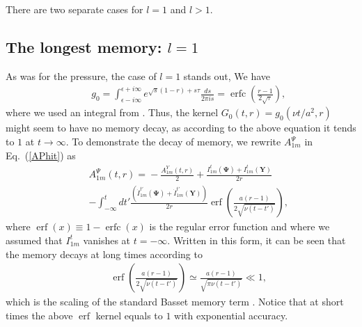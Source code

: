 \documentclass[aps,prx,twocolumn,amsmath,amssymb,amsfonts]{revtex4-2}
\DeclareMathOperator\erfc{erfc}
\DeclareMathOperator\erf{erf}
\begin{document}
There are two separate cases for $l=1$ and $l>1$.

\subsection{The longest memory: $l=1$}

As was for the pressure, the case of $l=1$ stands out,  We have
\begin{eqnarray}&&\!\!\!\!\!\!\!
g_0\!=\!\int_{\epsilon-i\infty}^{\epsilon+i\infty}\!e^{\sqrt{s}(1\!-\!r)\!+\!s\tau}\frac{ds}{2\pi i s}\!=\!\erfc\left(\frac{r\!-\!1}{2\sqrt{\tau}}\right),\label{g0}
\end{eqnarray}
where we used an integral from \cite{prud}. Thus, the kernel $G_0(t, r)=g_0\left(\nu t/a^2, r\right)$ might seem to have no memory decay, as according to the above equation it tends to $1$ at $t\to\infty$. To demonstrate the decay of memory, we rewrite $A_{1m}^{\Psi}$ in Eq.~(\ref{APhit}) as
\begin{eqnarray}&&
A_{1m}^{\Psi}(t, r)\!=\!-\frac{A_{1m}^{Y}(t, r)}{2}\!+\! \frac{I_{1m}^{t}(\bm \Psi) \!+\!I_{1m}^{t}(\bm Y)}{2r}
\label{asls}\\&&
-\int_{-\infty}^{t}dt'\frac{(\dot{I}_{1m}^{t'}(\bm \Psi) \!+\! \dot{I}_{1m}^{t'}(\bm Y))}{2r}\erf\left(\frac{a(r\!-\!1)}{2\sqrt{\nu(t\!-\!t')}}\right),\nonumber
\end{eqnarray}
where $\erf\left(x\right)\equiv 1-\erfc\left(x\right)$ is the regular error function and where we assumed that $I_{1m}^{t}$ vanishes at $t=-\infty$. Written in this form, it can be seen that the memory decays at long times according to
\begin{eqnarray}&&\!\!\!\!\!\!
\erf\left(\frac{a(r\!-\!1)}{2\sqrt{\nu(t\!-\!t')}}\right)\!\simeq\! \frac{a(r\!-\!1)}{\sqrt{\pi\nu(t\!-\!t')}}%
\ll\! 1,
\end{eqnarray}
which is the scaling of the standard Basset memory term \cite{kim}. Notice that at short times the above $\erf$ kernel equals to $1$ with exponential accuracy.
\end{document}
